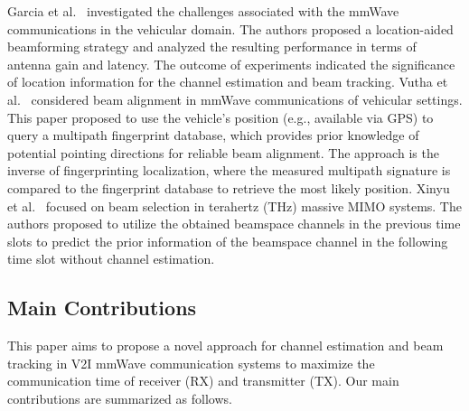 \documentclass{ieeeaccess}
\begin{document}
Garcia et al.~\cite{garcia2016location} investigated the challenges associated with the mmWave communications in the vehicular domain. The authors proposed a location-aided beamforming strategy and analyzed the resulting performance in terms of antenna gain and latency. The outcome of experiments indicated the significance of location information for the channel estimation and beam tracking. Vutha et al.~\cite{va2017inverse} considered beam alignment in mmWave communications of vehicular settings. This paper proposed to use the vehicle’s position (e.g., available via GPS) to query a multipath
fingerprint database, which provides prior knowledge of potential pointing directions for reliable beam alignment. The approach is the inverse of fingerprinting localization, where the measured multipath signature is compared to the fingerprint database to retrieve the most likely position. Xinyu et al.~\cite{gao2016fast} focused on beam selection in terahertz (THz) massive MIMO systems. The authors proposed to utilize the obtained beamspace channels in the previous time slots to predict the prior
information of the beamspace channel in the following time slot without channel estimation.
























\subsection{Main Contributions}
This paper aims to propose a novel approach for channel estimation and beam tracking in V2I mmWave communication systems to maximize the communication time of receiver (RX) and transmitter (TX). Our main contributions are summarized as follows.
\end{document}
